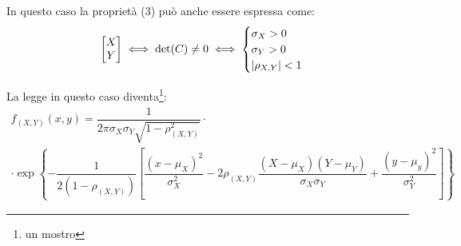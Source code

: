 In questo caso la proprietà (3) può anche essere espressa come:
$$ \begin{bmatrix}X\\Y\end{bmatrix} \iff \det(C) \neq 0 \iff \begin{cases} \sigma_X > 0 \\ \sigma_Y > 0 \\ \lvert\rho_{X,Y}\rvert < 1 \end{cases}$$

La legge in questo caso diventa\footnote{un mostro}:
\begin{gather*}
  f_{(X,Y)}(x,y)= \dfrac{1}{2 \pi \sigma_X \sigma_Y \sqrt{1- \rho_{(X,Y)}^2}} \cdot \\
  \cdot \exp \left \{ - \dfrac{1}{2(1-\rho_{(X,Y)})} \left[ \dfrac{(x - \mu_X)^2}{\sigma_X^2} - 2 \rho_{(X,Y)} \dfrac{(X-\mu_X)(Y-\mu_Y)}{\sigma_X \sigma_Y} + \dfrac{(y - \mu_y)^2}{\sigma_Y^2} \right]  \right \}
\end{gather*}

\cleardoublepage
